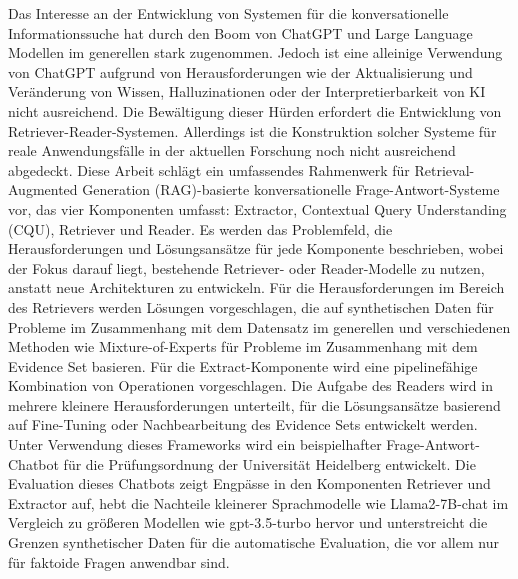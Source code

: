 Das Interesse an der Entwicklung von Systemen für die konversationelle Informations\-suche hat durch den Boom von ChatGPT und Large Language Modellen im generellen stark zugenommen. Jedoch ist eine alleinige Verwendung von ChatGPT aufgrund von Herausforderungen wie der Aktualisierung und Veränderung von Wissen, Halluzinationen oder der Interpretierbarkeit von KI nicht ausreichend. Die Bewältigung dieser Hürden erfordert die Entwicklung von Retriever-Reader-Systemen. Allerdings ist die Konstruktion solcher Systeme für reale Anwendungsfälle in der aktuellen Forschung noch nicht ausreichend abgedeckt. Diese Arbeit schlägt ein umfassendes Rahmenwerk für Retrieval-Augmented Generation (RAG)-basierte konversationelle Frage-Antwort-Systeme vor, das vier Komponenten umfasst: Extractor, Contextual Query Understanding (CQU), Retriever und Reader. Es werden das Problemfeld, die Herausforderungen und Lösungsansätze für jede Komponente beschrieben, wobei der Fokus darauf liegt, bestehende Retriever- oder Reader-Modelle zu nutzen, anstatt neue Architekturen zu entwickeln. Für die Herausforderungen im Bereich des Retrievers werden Lösungen vorgeschlagen, die auf synthetischen Daten für Probleme im Zusammenhang mit dem Datensatz im generellen und verschiedenen Methoden wie Mixture-of-Experts für Probleme im Zusammenhang mit dem Evidence Set basieren. Für die Extract-Komponente wird eine pipelinefähige Kombination von Operationen vorgeschlagen. Die Aufgabe des Readers wird in mehrere kleinere Herausforderungen unterteilt, für die Lösungsansätze basierend auf Fine-Tuning oder Nachbearbeitung des Evidence Sets entwickelt werden. Unter Verwendung dieses Frameworks wird ein beispielhafter Frage-Antwort-Chatbot für die Prüfungsordnung der Universität Heidelberg entwickelt. Die Evaluation dieses Chatbots zeigt Engpässe in den Komponenten Retriever und Extractor auf, hebt die Nachteile kleinerer Sprachmodelle wie Llama2-7B-chat im Vergleich zu größeren Modellen wie gpt-3.5-turbo hervor und unterstreicht die Grenzen synthetischer Daten für die automatische Evaluation, die vor allem nur für faktoide Fragen anwendbar sind.